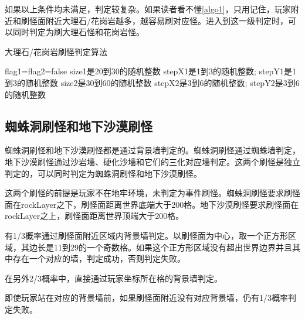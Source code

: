 如果以上条件均未满足，判定较复杂。如果读者看不懂\autoref{algo1}，只用记住，玩家附近和刷怪面附近大理石/花岗岩越多，越容易刷对应怪。进入到这一级判定时，可以同时判定为刷大理石怪和花岗岩怪。

\begin{algorithm}[!h]
\caption{大理石/花岗岩刷怪判定算法}\label{algo1}
flag1=flag2=false\;
size1是20到30的随机整数\; 
stepX1是1到3的随机整数; stepY1是1到3的随机整数\;
size2是30到60的随机整数\; 
stepX2是3到6的随机整数; stepY2是3到6的随机整数\;
\end{algorithm}

\subsection{蜘蛛洞刷怪和地下沙漠刷怪}
蜘蛛洞刷怪和地下沙漠刷怪都是通过背景墙判定的。蜘蛛洞刷怪通过蜘蛛墙判定，地下沙漠刷怪通过沙岩墙、硬化沙墙和它们的三化对应墙判定。这两个刷怪是独立判定的，可以同时判定为蜘蛛洞刷怪和地下沙漠刷怪。

这两个刷怪的前提是玩家不在地牢环境，未判定为事件刷怪。蜘蛛洞刷怪要求刷怪面在rockLayer之下，刷怪面距离世界底端大于200格。地下沙漠刷怪要求刷怪面在rockLayer之上，刷怪面距离世界顶端大于200格。

有1/3概率通过刷怪面附近区域内背景墙判定。以刷怪面为中心，取一个正方形区域，其边长是11到29的一个奇数格。如果这个正方形区域没有超出世界边界并且其中存在一个对应的墙，判定成功，否则判定失败。

在另外2/3概率中，直接通过玩家坐标所在格的背景墙判定。

\begin{remark}
即使玩家站在对应的背景墙前，如果刷怪面附近没有对应背景墙，仍有1/3概率判定失败。
\end{remark}

